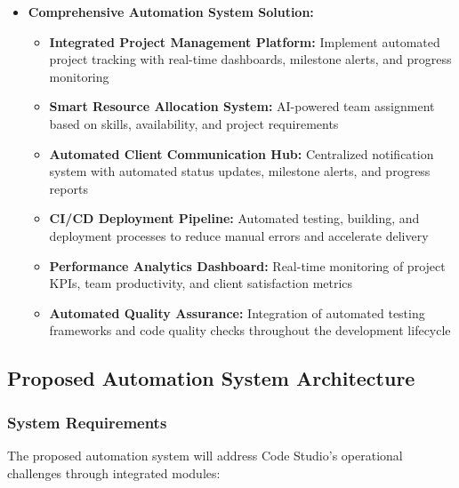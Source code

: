 \documentclass[12pt,a4paper]{article}
\begin{document}
\begin{itemize}
    \newpage
    \item \textbf{Comprehensive Automation System Solution:}
    \begin{itemize}
        \item \textbf{Integrated Project Management Platform:} Implement automated project tracking with real-time dashboards, milestone alerts, and progress monitoring
        \item \textbf{Smart Resource Allocation System:} AI-powered team assignment based on skills, availability, and project requirements
        \item \textbf{Automated Client Communication Hub:} Centralized notification system with automated status updates, milestone alerts, and progress reports
        \item \textbf{CI/CD Deployment Pipeline:} Automated testing, building, and deployment processes to reduce manual errors and accelerate delivery
        \item \textbf{Performance Analytics Dashboard:} Real-time monitoring of project KPIs, team productivity, and client satisfaction metrics
        \item \textbf{Automated Quality Assurance:} Integration of automated testing frameworks and code quality checks throughout the development lifecycle
    \end{itemize}
\end{itemize}

\subsection{Proposed Automation System Architecture}

\subsubsection{System Requirements}
The proposed automation system will address Code Studio's operational challenges through integrated modules:
\end{document}
